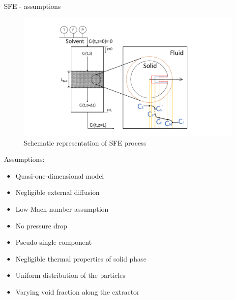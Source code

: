 \documentclass[8pt]{beamer}
\begin{document}
	\begin{frame}[fragile]{SFE - assumptions}
		\begin{minipage}[b]{0.475\textwidth}
			\begin{figure}[!h]
				\centering
				\includegraphics[trim = 5cm 0cm 5cm 0cm,clip,width=\textwidth]{Figures/SFE_Diagram.pdf}
				\caption{Schematic representation of SFE process}
			\end{figure} 
		\end{minipage}
		\hfill \vrule \hfill
		\begin{minipage}[b]{0.475\textwidth}
			Assumptions:
			\begin{itemize}
				\item Quasi-one-dimensional model
				\item Negligible external diffusion
				\item Low-Mach number assumption
				\item No pressure drop
				\item Pseudo-single component
				\item Negligible thermal properties of solid phase
				\item Uniform distribution of the particles
				\item Varying void fraction along the extractor
			\end{itemize}
	\end{minipage}
	\end{frame}
	
\end{document}
